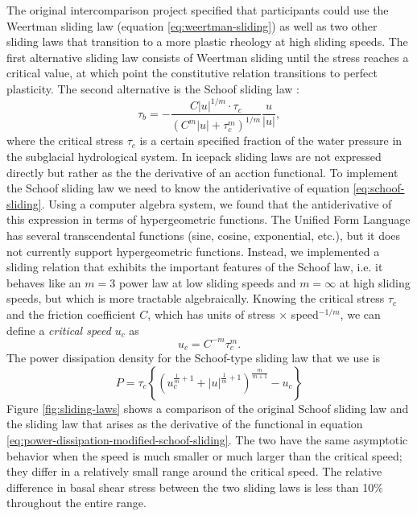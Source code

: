 \documentclass{article}
\theoremstyle{definition}
\theoremstyle{plain}
\begin{document}
The original intercomparison project specified that participants could use the Weertman sliding law (equation \eqref{eq:weertman-sliding}) as well as two other sliding laws that transition to a more plastic rheology at high sliding speeds.
The first alternative sliding law consists of Weertman sliding until the stress reaches a critical value, at which point the constitutive relation transitions to perfect plasticity.
The second alternative is the Schoof sliding law \citep{schoof2005effect}:
\begin{equation}
    \tau_b = -\frac{C|u|^{1/m}\cdot \tau_c}{(C^m|u| + \tau_c^m)^{1/m}}\frac{u}{|u|},
    \label{eq:schoof-sliding}
\end{equation}
where the critical stress $\tau_c$ is a certain specified fraction of the water pressure in the subglacial hydrological system.
In icepack sliding laws are not expressed directly but rather as the the derivative of an acction functional.
To implement the Schoof sliding law we need to know the antiderivative of equation \eqref{eq:schoof-sliding}.
Using a computer algebra system, we found that the antiderivative of this expression in terms of hypergeometric functions.
The Unified Form Language has several transcendental functions (sine, cosine, exponential, etc.), but it does not currently support hypergeometric functions.
Instead, we implemented a sliding relation that exhibits the important features of the Schoof law, i.e. it behaves like an $m = 3$ power law at low sliding speeds and $m = \infty$ at high sliding speeds, but which is more tractable algebraically.
Knowing the critical stress $\tau_c$ and the friction coefficient $C$, which has units of stress $\times$ speed${}^{-1/m}$, we can define a \emph{critical speed} $u_c$ as
\begin{equation}
    u_c = C^{-m}\tau_c^m.
\end{equation}
The power dissipation density for the Schoof-type sliding law that we use is
\begin{equation}
    P = \tau_c\left\{\left(u_c^{\frac{1}{m} + 1} + |u|^{\frac{1}{m} + 1}\right)^{\frac{m}{m + 1}} - u_c\right\}
    \label{eq:power-dissipation-modified-schoof-sliding}
\end{equation}
Figure \ref{fig:sliding-laws} shows a comparison of the original Schoof sliding law and the sliding law that arises as the derivative of the functional in equation \eqref{eq:power-dissipation-modified-schoof-sliding}.
The two have the same asymptotic behavior when the speed is much smaller or much larger than the critical speed; they differ in a relatively small range around the critical speed.
The relative difference in basal shear stress between the two sliding laws is less than 10\% throughout the entire range.
\end{document}
